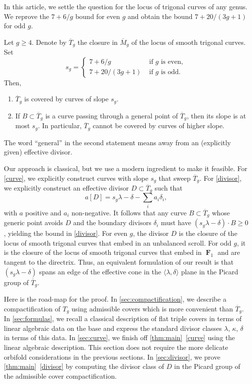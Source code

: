 \documentclass{amsart}
\renewcommand {\o}[1]{\overline{#1}}
\DeclareMathOperator{\F}{\mathbf F}
\renewcommand{\o}{\overline}
\begin{document}
In this article, we settle the question for the locus of trigonal curves of any genus. We reprove the $7+6/g$ bound for even $g$ and obtain the bound $7+20/(3g+1)$ for odd $g$.
\begin{theorem}\label{thm:main}
  Let $g \geq 4$. Denote by $\o T_g$ the closure in $\o M_g$ of
  the locus of smooth trigonal curves. Set
  \[ s_g = \begin{cases}
    7 + 6/g & \text{ if $g$ is even},\\
    7 + 20/(3g+1) & \text{ if $g$ is odd}.
  \end{cases}
  \]
  Then,
  \begin{enumerate}
  \item $\o T_g$ is covered by curves of slope $s_g$. \label{curve}
  \item If $B \subset \o T_g$ is a curve passing through a general
    point of $\o T_g$, then its slope is at most $s_g$. In
    particular, $\o T_g$ cannot be covered by curves of higher slope. \label{divisor}
  \end{enumerate}
  The word ``general'' in the second statement means away from an
  (explicitly given) effective divisor.
\end{theorem}
Our approach is classical, but we use a modern ingredient to make it
feasible. For \eqref{curve}, we explicitly construct curves with slope $s_g$ that sweep $\o T_g$. For \eqref{divisor}, we explicitly
construct an effective divisor $D \subset \o T_g$ such that
\[ a[D] = s_g \lambda - \delta - \sum_{i} a_i\delta_i,\] with $a$
positive and $a_i$ non-negative. It follows that any curve $B \subset
\o T_g$ whose generic point avoids $D$ and the boundary divisors
$\delta_i$ must have $(s_g \lambda - \delta) \cdot B \geq 0$, yielding
the bound in \eqref{divisor}. For even $g$, the divisor $D$
is the closure of the locus of smooth trigonal curves that embed in an
unbalanced scroll. For odd $g$, it is the closure of the
locus of smooth trigonal curves that embed in $\F_1$ and are tangent to
the directrix. Thus, an equivalent formulation of our result is that
$(s_g\lambda - \delta)$ spans an edge of the effective cone in the
$\langle \lambda, \delta \rangle$ plane in the Picard group of $\o T_g$.

Here is the road-map for the proof. In \autoref{sec:compactification},
we describe a compactification of $T_g$ using admissible covers which
is more convenient than $\o T_g$. In \autoref{sec:formulas}, we recall
a classical description of flat triple covers in terms of linear
algebraic data on the base and express the standard divisor classes
$\lambda$, $\kappa$, $\delta$ in terms of this data. In
\autoref{sec:curve}, we finish off \autoref{thm:main}~\eqref{curve}
using the linear algebraic description. This section does not require
the more delicate orbifold considerations in the previous sections. In
\autoref{sec:divisor}, we prove \autoref{thm:main}~\eqref{divisor} by
computing the divisor class of $D$ in the Picard group of the
admissible cover compactification.
\end{document}
